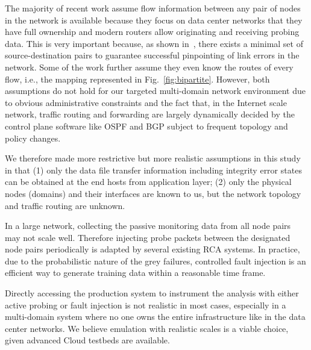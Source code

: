 The majority of recent work assume flow information between any pair of nodes in the network is available because they focus on data center networks that they have full ownership and modern routers allow originating and receiving probing data. This is very important because, as shown in~\cite{netbouncer:nsdi18}, there exists a minimal set of source-destination pairs to guarantee successful pinpointing of link errors in the network. Some of the work further assume they even know the routes of every flow, i.e., the mapping represented in Fig.~\ref{fig:bipartite}. However, both assumptions do not hold for our targeted multi-domain network environment due to obvious administrative constraints and the fact that, in the Internet scale network, traffic routing and forwarding are largely dynamically decided by the control plane software like OSPF and BGP subject to frequent topology and policy changes. 

We therefore made more restrictive but more realistic assumptions in this study in that (1) only the data file transfer information including integrity error states can be obtained at the end hosts from application layer; (2) only the physical nodes (domains) and their interfaces are known to us, but the network topology and traffic routing are unknown. 

In a large network, collecting the passive monitoring data from all node pairs may not scale well. Therefore injecting probe packets between the designated node pairs periodically is adapted by several existing RCA systems. In practice, due to the probabilistic nature of the grey failures, controlled fault injection is an efficient way to generate training data within a reasonable time frame.

Directly accessing the production system to instrument the analysis with either active probing or fault injection is not realistic in most cases, especially in a multi-domain system where no one owns the entire infrastructure like in the data center networks. We believe emulation with realistic scales is a viable choice, given advanced Cloud testbeds are available.








